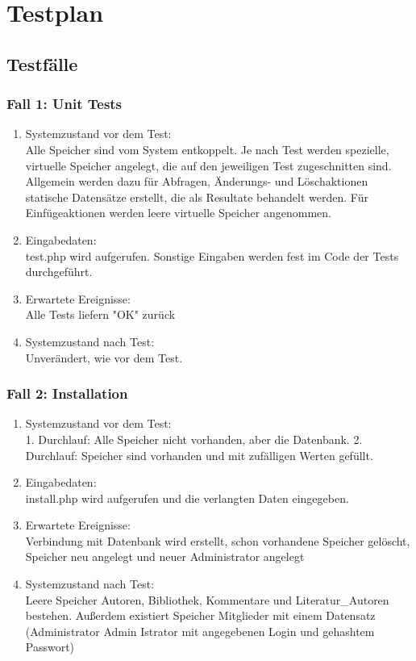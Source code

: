 \section{Testplan}
\subsection{Testfälle}

\subsubsection{Fall 1: Unit Tests}
\begin{enumerate}
\item Systemzustand vor dem Test:\\
	Alle Speicher sind vom System entkoppelt. Je nach Test werden spezielle, virtuelle Speicher angelegt, die auf den jeweiligen Test zugeschnitten sind. Allgemein werden dazu für Abfragen, Änderungs- und Löschaktionen statische Datensätze erstellt, die als Resultate behandelt werden. Für Einfügeaktionen werden leere virtuelle Speicher angenommen.
\item Eingabedaten:\\
	test.php wird aufgerufen. Sonstige Eingaben werden fest im Code der Tests durchgeführt.
\item Erwartete Ereignisse:\\
	Alle Tests liefern "OK" zurück
\item Systemzustand nach Test:\\
	Unverändert, wie vor dem Test.
\end{enumerate}

\subsubsection{Fall 2: Installation}
\begin{enumerate}
\item Systemzustand vor dem Test:\\
	1. Durchlauf: Alle Speicher nicht vorhanden, aber die Datenbank. 2. Durchlauf: Speicher sind vorhanden und mit zufälligen Werten gefüllt.
\item Eingabedaten:\\
	install.php wird aufgerufen und die verlangten Daten eingegeben.
\item Erwartete Ereignisse:\\
	Verbindung mit Datenbank wird erstellt, schon vorhandene Speicher gelöscht, Speicher neu angelegt und neuer Administrator angelegt
\item Systemzustand nach Test:\\
	Leere Speicher Autoren, Bibliothek, Kommentare und Literatur\_Autoren bestehen. Außerdem existiert Speicher Mitglieder mit einem Datensatz (Administrator Admin Istrator mit angegebenen Login und gehashtem Passwort)
\end{enumerate}

